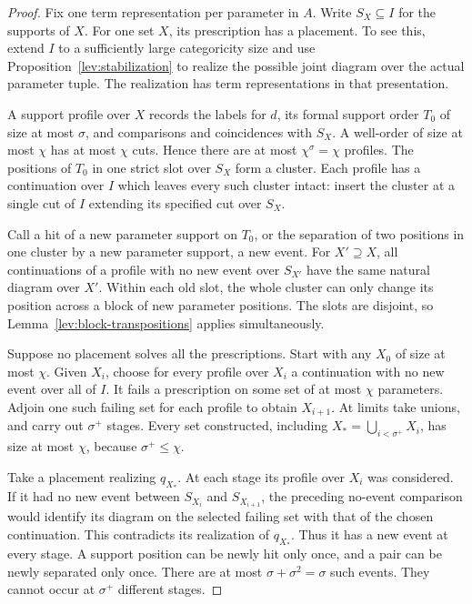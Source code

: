 \begin{proof}
Fix one term representation per parameter in \(A\). Write
\(S_X\subseteq I\) for the supports of \(X\). For one set
\(X\), its prescription has a placement. To see this, extend
\(I\) to a sufficiently large categoricity size and use
Proposition~\ref{lev:stabilization} to realize the possible
joint diagram over the actual parameter tuple. The realization
has term representations in that presentation.

A support profile over \(X\) records the labels for \(d\),
its formal support order \(T_0\) of size at most \(\sigma\),
and comparisons and coincidences with \(S_X\). A well-order
of size at most \(\chi\) has at most \(\chi\) cuts. Hence
there are at most \(\chi^\sigma=\chi\) profiles. The positions
of \(T_0\) in one strict slot over \(S_X\) form a cluster.
Each profile has a continuation over \(I\) which leaves
every such cluster intact: insert the cluster at a single
cut of \(I\) extending its specified cut over \(S_X\).

Call a hit of a new parameter support on \(T_0\), or the
separation of two positions in one cluster by a new parameter
support, a new event. For \(X'\supseteq X\), all continuations
of a profile with no new event over \(S_{X'}\) have the same
natural diagram over \(X'\). Within each old slot, the whole
cluster can only change its position across a block of new
parameter positions. The slots are disjoint, so
Lemma~\ref{lev:block-transpositions} applies simultaneously.

Suppose no placement solves all the prescriptions. Start with
any \(X_0\) of size at most \(\chi\). Given \(X_i\), choose
for every profile over \(X_i\) a continuation with no new
event over all of \(I\). It fails a prescription on some set
of at most \(\chi\) parameters. Adjoin one such failing set
for each profile to obtain \(X_{i+1}\). At limits take unions,
and carry out \(\sigma^+\) stages. Every set constructed,
including \(X_* = \bigcup_{i<\sigma^+}X_i\), has size at most
\(\chi\), because \(\sigma^+\le\chi\).

Take a placement realizing \(q_{X_*}\). At each stage its
profile over \(X_i\) was considered. If it had no new event
between \(S_{X_i}\) and \(S_{X_{i+1}}\), the preceding
no-event comparison would identify its diagram on the
selected failing set with that of the chosen continuation.
This contradicts its realization of \(q_{X_*}\). Thus it
has a new event at every stage. A support position can be
newly hit only once, and a pair can be newly separated only
once. There are at most \(\sigma+\sigma^2=\sigma\) such
events. They cannot occur at \(\sigma^+\) different stages.
\end{proof}

